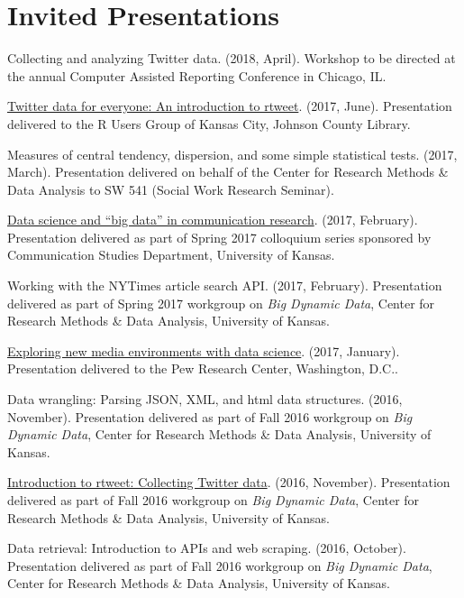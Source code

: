 \section{Invited Presentations}
  \begin{bibenum}
    \item[] Collecting and analyzing Twitter data. (2018, April).
      Workshop to be directed at the annual Computer Assisted Reporting Conference in Chicago, IL.
    \item[] \href{https://mkearney.github.io/rusersKC}{Twitter data for everyone: An introduction to rtweet}. (2017, June).
      Presentation delivered to the R Users Group of Kansas City, Johnson County Library.
    \item[] Measures of central tendency, dispersion, and some simple statistical tests. (2017, March).
      Presentation delivered on behalf of the Center for Research Methods \& Data Analysis to SW 541 (Social Work Research Seminar).
    \item[]
      \href{https://mkearney.github.io/COLLOQUIUM/slides.html}{Data science and ``big data'' in communication research}. (2017, February).
      Presentation delivered as part of Spring 2017 colloquium series sponsored by Communication Studies Department, University of Kansas.
    \item[] Working with the NYTimes article search API. (2017, February).
      Presentation delivered as part of Spring 2017 workgroup on \textit{Big Dynamic Data},
      Center for Research Methods \& Data Analysis, University of Kansas.
    \item[]
      \href{https://mkearney.github.io/research_talk/pewtalk.html}{Exploring new media environments with data science}. (2017, January).
      Presentation delivered to the Pew Research Center, Washington, D.C..
    \item[] Data wrangling: Parsing JSON, XML, and html data structures. (2016, November).
      Presentation delivered as part of Fall 2016 workgroup on \textit{Big Dynamic Data},
      Center for Research Methods \& Data Analysis, University of Kansas.
    \item[]
      \href{https://github.com/mkearney/bigdata-workgroup}{Introduction to rtweet: Collecting Twitter data}. (2016, November).
      Presentation delivered as part of Fall 2016 workgroup on \textit{Big Dynamic Data},
      Center for Research Methods \& Data Analysis, University of Kansas.
    \item[] Data retrieval: Introduction to APIs and web scraping. (2016, October).
      Presentation delivered as part of Fall 2016 workgroup on \textit{Big Dynamic Data},
      Center for Research Methods \& Data Analysis, University of Kansas.
  \end{bibenum}
